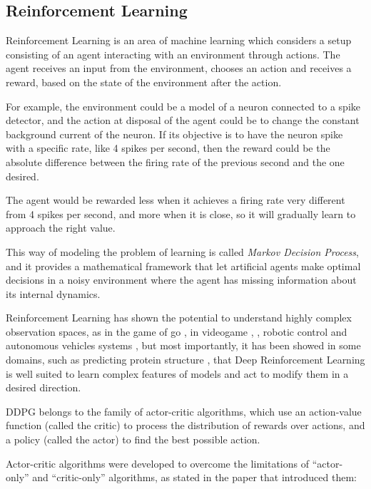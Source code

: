\subsection{Reinforcement Learning} 


Reinforcement Learning is an area of machine learning which considers a setup consisting of an agent interacting with an environment through actions. The agent receives an input from the environment, chooses an action and receives a reward, based on the state of the environment after the action.

For example, the environment could be a model of a neuron connected to a spike detector, and the action at disposal of the agent could be to change the constant background current of the neuron. If its objective is to have the neuron spike with a specific rate, like 4 spikes per second, then the reward could be the absolute difference between the firing rate of the previous second and the one desired.

The agent would be rewarded less when it achieves a firing rate very different from 4 spikes per second, and more when it is close, so it will gradually learn to approach the right value.

This way of modeling the problem of learning is called \emph{Markov Decision Process}, and it provides a mathematical framework that let artificial agents make optimal decisions in a noisy environment where the agent has missing information about its internal dynamics.

Reinforcement Learning has shown the potential to understand highly complex observation spaces, as in the game of go \cite{silver2017mastering}, in videogame \cite{vinyals2019alphastar}, \cite{berner2019dota}, robotic control \cite{andrychowicz2020learning} and autonomous vehicles systems \cite{sallab2017deep}, but most importantly, it has been showed in some domains, such as predicting protein structure \cite{alphafold}, that Deep Reinforcement Learning is well suited to learn complex features of models and act to modify them in a desired direction.

DDPG belongs to the family of actor-critic algorithms, which use an action-value function (called the critic) to process the distribution of rewards over actions, and a policy (called the actor) to find the best possible action.

Actor-critic algorithms were developed to overcome the limitations of ``actor-only'' and ``critic-only'' algorithms, as stated in the paper that introduced them:

